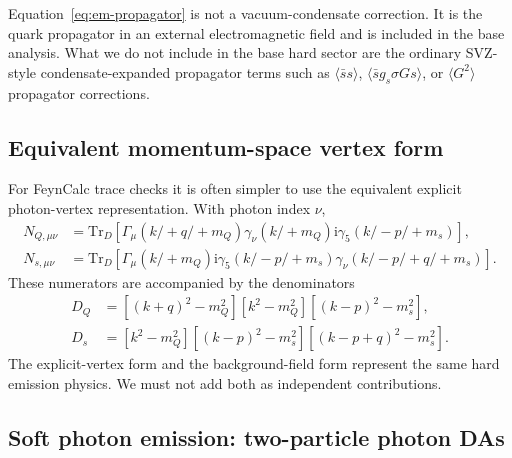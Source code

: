\documentclass[11pt]{article}
\newcommand{\ii}{\mathrm{i}}
\newcommand{\Tr}{\mathrm{Tr}}
\newcommand{\slashp}[1]{#1\!\!\!/}
\begin{document}
Equation~\eqref{eq:em-propagator} is not a vacuum-condensate correction.  It is
the quark propagator in an external electromagnetic field and is included in
the base analysis.  What we do not include in the base hard sector are the
ordinary SVZ-style condensate-expanded propagator terms such as
$\langle\bar s s\rangle$, $\langle\bar s g_s\sigma Gs\rangle$, or
$\langle G^2\rangle$ propagator corrections.

\subsection{Equivalent momentum-space vertex form}

For FeynCalc trace checks it is often simpler to use the equivalent explicit
photon-vertex representation.  With photon index $\nu$,
\begin{align}
  N_{Q,\mu\nu}
  &=
  \Tr_D\!\left[
    \Gamma_\mu
    (\slashp{k}+\slashp{q}+m_Q)
    \gamma_\nu
    (\slashp{k}+m_Q)
    \ii\gamma_5
    (\slashp{k}-\slashp{p}+m_s)
  \right],
  \\
  N_{s,\mu\nu}
  &=
  \Tr_D\!\left[
    \Gamma_\mu
    (\slashp{k}+m_Q)
    \ii\gamma_5
    (\slashp{k}-\slashp{p}+m_s)
    \gamma_\nu
    (\slashp{k}-\slashp{p}+\slashp{q}+m_s)
  \right].
\end{align}
These numerators are accompanied by the denominators
\begin{align}
  D_Q &=
  [(k+q)^2-m_Q^2][k^2-m_Q^2][(k-p)^2-m_s^2],\\
  D_s &=
  [k^2-m_Q^2][(k-p)^2-m_s^2][(k-p+q)^2-m_s^2].
\end{align}
The explicit-vertex form and the background-field form represent the same hard
emission physics.  We must not add both as independent contributions.

\subsection{Soft photon emission: two-particle photon DAs}
\end{document}
